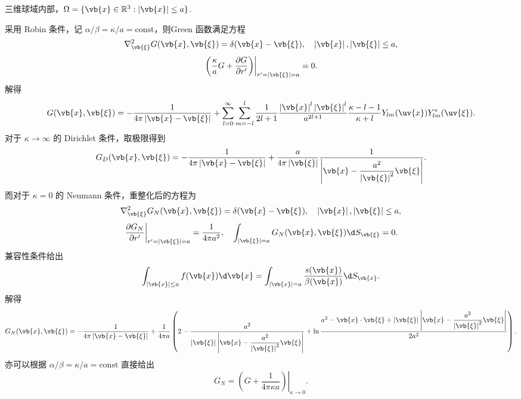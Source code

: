 \begin{example}
	三维球域内部，\(\Omega=\{\vb{x}\in\mathbb{R}^3:\left|\vb{x}\right|\leq a\}\).
	
	采用 Robin 条件，记 \(\alpha/\beta=\kappa/a=\mathrm{const}\)，则Green 函数满足方程
	\begin{equation*}
		\nabla_{\vb{\xi}}^2G(\vb{x},\vb{\xi})=\delta(\vb{x}-\vb{\xi}),\quad
		\left|\vb{x}\right|,\left|\vb{\xi}\right|\leq a,
	\end{equation*}
	\begin{equation*}
		\left.\left(\frac{\kappa}{a}G+\frac{\partial G}{\partial r'}\right)\right|_{r'=\left|\vb{\xi}\right|=a}=0.
	\end{equation*}
	解得
	\begin{equation*}
		G(\vb{x},\vb{\xi})
		=-\frac{1}{4\pi\left|\vb{x}-\vb{\xi}\right|}
		+\sum_{l=0}^\infty\sum_{m=-l}^l\frac{1}{2l+1}\frac{\left|\vb{x}\right|^l\left|\vb{\xi}\right|^l}{a^{2l+1}}\frac{\kappa-l-1}{\kappa+l}Y_{lm}(\uv{x})Y_{lm}^*(\uv{\xi}).
	\end{equation*}
	对于 \(\kappa\to\infty\) 的 Dirichlet 条件，取极限得到
	\begin{equation*}
		G_D(\vb{x},\vb{\xi})
		=-\frac{1}{4\pi\left|\vb{x}-\vb{\xi}\right|}
		+\frac{a}{4\pi\left|\vb{\xi}\right|}\frac{1}{\left|\vb{x}-\dfrac{a^2}{\left|\vb{\xi}\right|^2}\vb{\xi}\right|}.
	\end{equation*}
	而对于 \(\kappa=0\) 的 Neumann 条件，重整化后的方程为
	\begin{equation*}
		\nabla_{\vb{\xi}}^2G_N(\vb{x},\vb{\xi})=\delta(\vb{x}-\vb{\xi}),\quad
		\left|\vb{x}\right|,\left|\vb{\xi}\right|\leq a,
	\end{equation*}
	\begin{equation*}
		\left.\frac{\partial G_N}{\partial r'}\right|_{r'=\left|\vb{\xi}\right|=a}=\frac{1}{4\pi a^2},\quad
		\int_{\left|\vb{\xi}\right|=a}G_N(\vb{x},\vb{\xi})\d S_{\vb{\xi}}=0.
	\end{equation*}
	兼容性条件给出
	\begin{equation*}
		\int_{\left|\vb{x}\right|\leq a}f(\vb{x})\d\vb{x}
		=\int_{\left|\vb{x}\right|=a}\frac{s(\vb{x})}{\beta(\vb{x})}\d S_{\vb{x}}.
	\end{equation*}
	解得
	\begin{equation*}
		G_N(\vb{x},\vb{\xi})
		=-\frac{1}{4\pi\left|\vb{x}-\vb{\xi}\right|}
		+\frac{1}{4\pi a}\left(2-\frac{a^2}{\left|\vb{\xi}\right|\left|\vb{x}-\dfrac{a^2}{\left|\vb{\xi}\right|^2}\vb{\xi}\right|}
		+\ln\frac{a^2-\vb{x}\cdot\vb{\xi}+\left|\vb{\xi}\right|\left|\vb{x}-\dfrac{a^2}{\left|\vb{\xi}\right|^2}\vb{\xi}\right|}{2a^2}\right).
	\end{equation*}
	亦可以根据 \(\alpha/\beta=\kappa/a=\mathrm{const}\) 直接给出
	\begin{equation*}
		G_N=\left.\left(G+\frac{1}{4\pi\kappa a}\right)\right|_{\kappa\to0}.
	\end{equation*}
\end{example}

